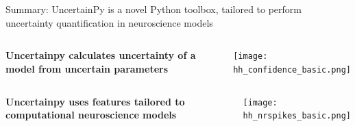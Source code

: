\documentclass[presentation]{beamer}
\begin{document}
  \begin{frame}{Summary: UncertainPy is a novel Python toolbox, tailored to perform uncertainty quantification in neuroscience models}
\vspace{-10mm}
\begin{columns}

     \begin{center}
        \raggedright
      \bf{Uncertainpy calculates uncertainty of a model from uncertain parameters}
     \end{center}
     \begin{center}
            \texttt{[image: hh\_confidence\_basic.png]}
     \end{center}

 \end{columns}

\vspace{5mm}

\begin{columns}
  \begin{center}
      \raggedright
   \bf{Uncertainpy uses features tailored to computational neuroscience models}
  \end{center}
     \begin{center}
            \texttt{[image: hh\_nrspikes\_basic.png]}
     \end{center}

 \end{columns}

\pause
{}




\end{frame}
\end{document}

